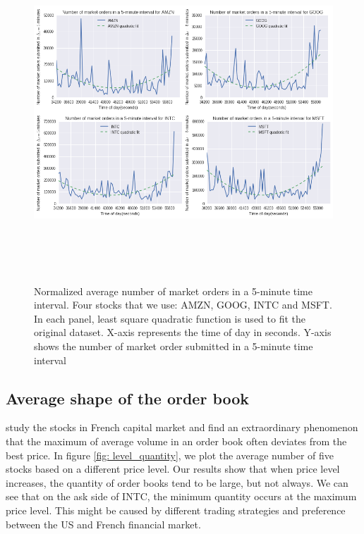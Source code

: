 \begin{figure}[hbtp]
	\begin{center}
		\includegraphics[width=6in, height=5in]{figures/market_vol_time.png}
	\end{center}
	\caption{Normalized average number of market orders in a 5-minute time interval. Four stocks that we use:  AMZN, GOOG, INTC and MSFT. In each panel, least square quadratic function is used to fit the original dataset. X-axis represents the time of day in seconds. Y-axis shows the number of market order submitted in a 5-minute time interval} \label{fig: market_vol_time}
\end{figure}

\subsection{Average shape of the order book}

\cite{bouchaud2002statistical} study the stocks in French capital market and find an extraordinary phenomenon that the maximum of average volume in an order book often deviates from the best price. In figure \ref {fig: level_quantity},  we plot the average number of five stocks based on a different price level. Our results show that when price level increases,  the quantity of order books tend to be large,  but not always. We can see that on the ask side of INTC,  the minimum quantity occurs at the maximum price level. This might be caused by different trading strategies and preference between the US and French financial market.   

